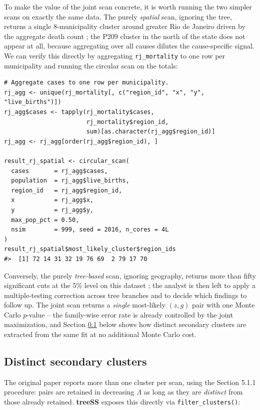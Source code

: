 To make the value of the joint scan concrete, it is worth running the
two simpler scans on exactly the same data. The purely \emph{spatial} scan,
ignoring the tree, returns a single 8-municipality cluster around
greater Rio de Janeiro driven by the aggregate death count
\citep[Table 5]{cancado2025}; the P209 cluster in the north of the state
does not appear at all, because aggregating over all causes dilutes the
cause-specific signal. We can verify this directly by aggregating
\texttt{rj\_mortality} to one row per municipality and running the circular
scan on the totals:

\begin{verbatim}
# Aggregate cases to one row per municipality.
rj_agg <- unique(rj_mortality[, c("region_id", "x", "y", "live_births")])
rj_agg$cases <- tapply(rj_mortality$cases,
                       rj_mortality$region_id,
                       sum)[as.character(rj_agg$region_id)]
rj_agg <- rj_agg[order(rj_agg$region_id), ]

result_rj_spatial <- circular_scan(
  cases       = rj_agg$cases,
  population  = rj_agg$live_births,
  region_id   = rj_agg$region_id,
  x           = rj_agg$x,
  y           = rj_agg$y,
  max_pop_pct = 0.50,
  nsim        = 999, seed = 2016, n_cores = 4L
)
result_rj_spatial$most_likely_cluster$region_ids
#>  [1] 72 14 31 32 19 76 69  2 79 17 70
\end{verbatim}

Conversely, the purely \emph{tree-based} scan, ignoring geography, returns more
than fifty significant cuts at the 5\% level on this dataset
\citep[Table 6]{cancado2025}; the analyst is then left to apply a
multiple-testing correction across tree branches and to decide which
findings to follow up. The joint scan returns a \emph{single} most-likely
\((z, g)\) pair with one Monte Carlo \(p\)-value -- the family-wise error
rate is already controlled by the joint maximization, and Section
\ref{sec-distinct-secondary} below shows how distinct secondary
clusters are extracted from the same fit at no additional Monte Carlo
cost.

\hypertarget{sec-distinct-secondary}{%
\subsection{Distinct secondary clusters}\label{sec-distinct-secondary}}

The original paper reports more than one cluster per scan, using the
Section 5.1.1 procedure: pairs are retained in decreasing \(\Lambda\) as long
as they are \emph{distinct} from those already retained. \textbf{treeSS} exposes
this directly via \texttt{filter\_clusters()}:

